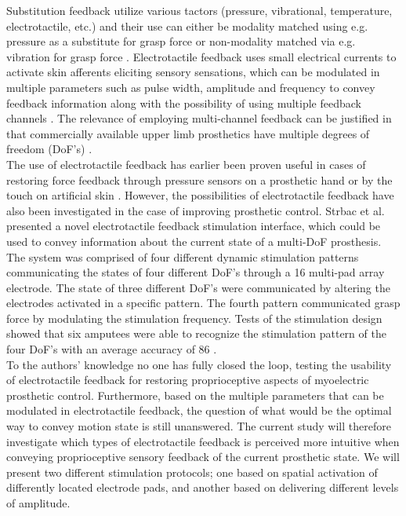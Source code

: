 Substitution feedback utilize various tactors (pressure, vibrational, temperature, electrotactile, etc.) and their use can either be modality matched using e.g. pressure as a substitute for grasp force \cite{Godfrey2017} or non-modality matched via e.g. vibration for grasp force \cite{Ninu2014,Nabeel2016}. 
Electrotactile feedback uses small electrical currents to activate skin afferents eliciting sensory sensations, which can be modulated in multiple parameters such as pulse width, amplitude and frequency to convey feedback information along with the possibility of using multiple feedback channels \cite{Geng2012}. The relevance of employing multi-channel feedback can be justified in that commercially available upper limb prosthetics have multiple degrees of freedom (DoF's) \cite{Cordella2016}. \\
%
The use of electrotactile feedback has earlier been proven useful in cases of restoring force feedback through pressure sensors on a prosthetic hand or by the touch on artificial skin \cite{Hartmann2014,Franceschi2015}. However, the possibilities of electrotactile feedback have also been investigated in the case of improving prosthetic control. Strbac et al. \cite{Strbac2016} presented a novel electrotactile feedback stimulation interface, which could be used to convey information about the current state of a multi-DoF prosthesis. The system was comprised of four different dynamic stimulation patterns communicating the states of four different DoF's through a 16 multi-pad array electrode. The state of three different DoF's were communicated by altering the electrodes activated in a specific pattern. The fourth pattern communicated grasp force by modulating the stimulation frequency. Tests of the stimulation design showed that six amputees were able to recognize the stimulation pattern of the four DoF's with an average accuracy of 86 \percent. \cite{Strbac2016} \\   
%
To the authors' knowledge no one has fully closed the loop, testing the usability of electrotactile feedback for restoring proprioceptive aspects of myoelectric prosthetic control. Furthermore, based on the multiple parameters that can be modulated in electrotactile feedback, the question of what would be the optimal way to convey motion state is still unanswered. The current study will therefore investigate which types of electrotactile feedback is perceived more intuitive when conveying proprioceptive sensory feedback of the current prosthetic state. We will present two different stimulation protocols; one based on spatial activation of differently located electrode pads, and another based on delivering different levels of amplitude.      


 
